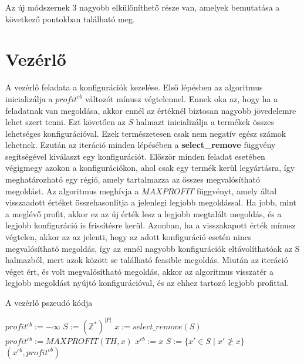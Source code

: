 Az új módszernek 3 nagyobb elkülöníthető része van, amelyek bemutatása a következő pontokban található meg.

\section{Vezérlő}
A vezérlő feladata a konfigurációk kezelése. Első lépésben az algoritmus inicializálja a $profit^{cb}$ változót mínusz végtelennel. Ennek oka az, hogy ha a feladatnak van megoldása, akkor ennél az értéknél biztosan nagyobb jövedelemre lehet szert tenni. Ezt követően az $S$ halmazt inicializálja a termékek összes lehetséges konfigurációval. Ezek természetesen csak nem negatív egész számok lehetnek. Ezután az iteráció minden lépésében a \textbf{select\_remove} függvény segítségével kiválaszt egy konfigurációt. Először minden feladat esetében végigmegy azokon a konfigurációkon, ahol csak egy termék kerül legyártásra, így meghatározható egy régió, amely tartalmazza az összes megvalósítható megoldást. Az algoritmus meghívja a $MAXPROFIT$ függvényt, amely által visszaadott értéket összehasonlítja a jelenlegi legjobb megoldással. Ha jobb, mint a meglévő profit, akkor ez az új érték lesz a legjobb megtalált megoldás, és a legjobb konfiguráció is frissítésre kerül. Azonban, ha a visszakapott érték mínusz végtelen, akkor az az jelenti, hogy az adott konfiguráció esetén nincs megvalósítható megoldás, így az ennél nagyobb konfigurációk eltávolíthatóak az S halmazból, mert azok között se található feasible megoldás. Miután az iteráció véget ért, és volt megvalósítható megoldás, akkor az algoritmus visszatér a legjobb megoldást nyújtó konfigurációval, és az ehhez tartozó legjobb profittal.

\begin{algorithm}[H]
\caption{A vezérlő pszeudó kódja}
\label{vezerlo}
\begin{algorithmic}[1]
	\State $profit^{cb}:= -\infty$
	\State $S:= (\mathbb{Z}^*)^{|P|}$
    	\State $x:= select\_remove(S)$
    		\State $profit^{cb}:=MAXPROFIT(TH,x)$
    		\State $x^{cb}:=x$    		
    		\State $S:=\{x'\in{S} \mid  x' \not\ge x\}$
    	\EndIf
    \EndWhile
    	\State \Return $(x^{cb},profit^{cb})$
    \EndIf
\EndProcedure
\end{algorithmic}
\end{algorithm}

